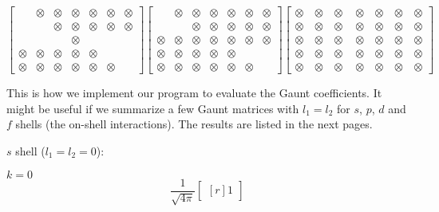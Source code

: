 \begin{equation*}
\begin{bmatrix}
   & \otimes & \otimes & \otimes & \otimes & \otimes & \otimes \\
   &  & \otimes & \otimes & \otimes & \otimes & \otimes \\
   &  &  & \otimes &  &  & \\
  \otimes & \otimes & \otimes & \otimes & \otimes &  & \\
  \otimes & \otimes & \otimes & \otimes & \otimes & \otimes & 
\end{bmatrix}
\begin{bmatrix}
   & \otimes & \otimes & \otimes & \otimes & \otimes & \otimes \\
   &  & \otimes & \otimes & \otimes & \otimes & \otimes \\
  \otimes & \otimes & \otimes & \otimes & \otimes & \otimes & \otimes \\
  \otimes & \otimes & \otimes & \otimes & \otimes &  & \\
  \otimes & \otimes & \otimes & \otimes & \otimes & \otimes & 
\end{bmatrix}
\begin{bmatrix}
  \otimes & \,\otimes & \,\otimes & \,\,\otimes & \,\otimes & \,\otimes & \,\otimes \\
  \otimes & \,\otimes & \,\otimes & \,\,\otimes & \,\otimes & \,\otimes & \,\otimes \\
  \otimes & \,\otimes & \,\otimes & \,\,\otimes & \,\otimes & \,\otimes & \,\otimes \\
  \otimes & \,\otimes & \,\otimes & \,\,\otimes & \,\otimes & \,\otimes & \,\otimes \\
  \otimes & \,\otimes & \,\otimes & \,\,\otimes & \,\otimes & \,\otimes & \,\otimes
\end{bmatrix}
\end{equation*}

This is how we implement our program to evaluate the Gaunt coefficients.
It might be useful if we summarize a few Gaunt matrices with $l_1=l_2$ for $s$,
$p$, $d$ and $f$ shells (the on-shell interactions). The results are listed in the
next pages.

\newpage
$s$ shell ($l_1=l_2=0$):

$k=0$
\begin{equation} \label{eq:Gstart}
\frac{1}{\sqrt{4\pi}}
\begin{bmatrix*}[r]
1
\end{bmatrix*}
\end{equation}

